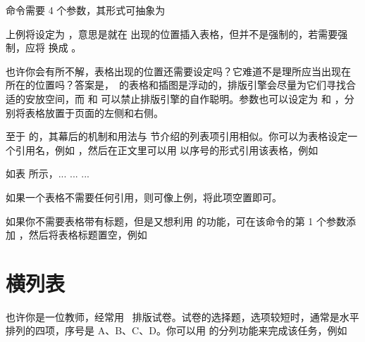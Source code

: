 
 命令需要 4 个参数，其形式可抽象为

\startTEX
{}
\stopTEX

上例将设定为 ，意思是就在  出现的位置插入表格，但并不是强制的，若需要强制，应将  换成 。

也许你会有所不解，表格出现的位置还需要设定吗？它难道不是理所应当出现在  所在的位置吗？答案是，\CONTEXT\ 的表格和插图是浮动的，排版引擎会尽量为它们寻找合适的安放空间，而  和  可以禁止排版引擎的自作聪明。参数也可以设定为  和 ，分别将表格放置于页面的左侧和右侧。

至于  的，其幕后的机制和用法与 \in[itemcite] 节介绍的列表项引用相似。你可以为表格设定一个引用名，例如 ，然后在正文里可以用 \tex{\in[foo]} 以序号的形式引用该表格，例如

\startTEX
如表 \in[foo] 所示，... ... ...\par
{}
\stopTEX

\noindent 如果一个表格不需要任何引用，则可像上例，将此项空置即可。

如果你不需要表格带有标题，但是又想利用  的功能，可在该命令的第 1 个参数添加 ，然后将表格标题置空，例如

\blank[halfline]


\startTEX
{}
\stopTEX

\section{横列表}

也许你是一位教师，经常用 \CONTEXT\ 排版试卷。试卷的选择题，选项较短时，通常是水平排列的四项，序号是 A、B、C、D。你可以用  的分列功能来完成该任务，例如

